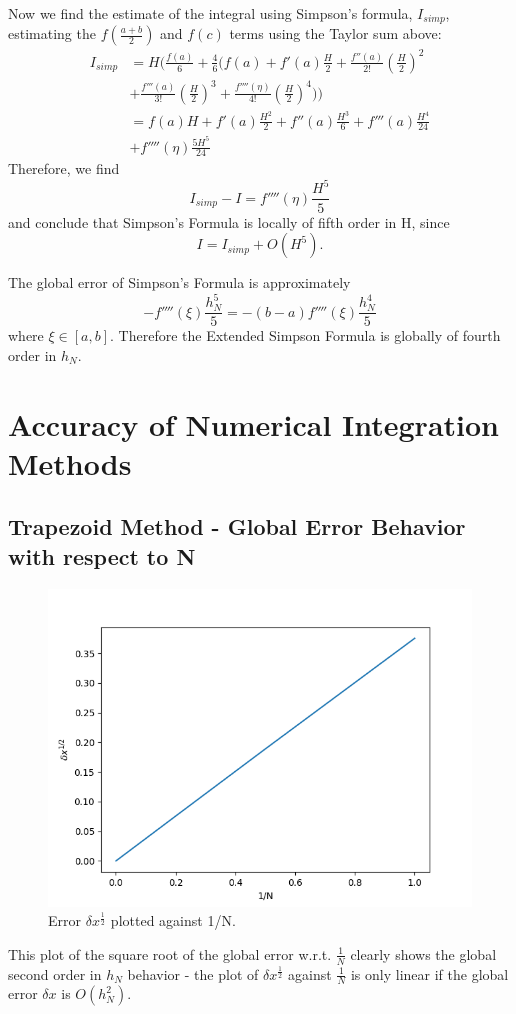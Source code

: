 \documentclass[11pt]{article}
\begin{document}
Now we find the estimate of the integral using Simpson's formula, $I_{simp}$, estimating the $f(\frac{a+b}{2})$ and $f(c)$ terms using the Taylor sum above:
\begin{align*}
I_{simp} &= H\bigg(\frac{f(a)}{6} + \frac{4}{6}\big(f(a) + f'(a)\frac{H}{2} + \frac{f''(a)}{2!} (\frac{H}{2})^2 \\
&+ \frac{f'''(a)}{3!} (\frac{H}{2})^3 + \frac{f''''(\eta)}{4!} (\frac{H}{2})^4 \big) \bigg) \\
&= f(a)H + f'(a)\frac{H^2}{2} + f''(a)\frac{H^3}{6} + f'''(a)\frac{H^4}{24} \\
&+ f''''(\eta)\frac{5H^5}{24}
\end{align*}
Therefore, we find
\[
I_{simp} - I = f''''(\eta)\frac{H^5}{5}
\]
and conclude that Simpson's Formula is locally of fifth order in H, since
\[
I = I_{simp} + O(H^5).
\]

The global error of Simpson's Formula is approximately
\[
-f''''(\xi)\frac{h_N^5}{5} = -(b-a)f''''(\xi)\frac{h_N^4}{5}
\]
where $\xi \in [a,b]$. Therefore the Extended Simpson Formula is globally of fourth order in $h_N$.
\newpage

\section{Accuracy of Numerical Integration Methods}
\subsection{Trapezoid Method - Global Error Behavior with respect to N}

\begin{figure}[htp]
\centering
\includegraphics[scale=0.80]{trap_err_5000.png}
\caption{Error $\delta x^{\frac{1}{2}}$ plotted against 1/N.}
\label{trap_err}
\end{figure}
This plot of the square root of the global error w.r.t. $\frac{1}{N}$ clearly shows the global second order in $h_N$ behavior - the plot of $\delta x^{\frac{1}{2}}$ against $\frac{1}{N}$ is only linear if the global error $\delta x$ is $O(h_N^2)$.
\end{document}

